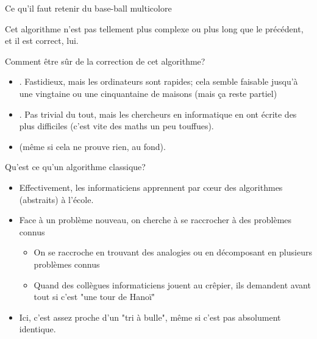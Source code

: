 \documentclass[final,hyperref={pdfpagelabels=false}]{beamer}
\begin{document}
\begin{frame}{Ce qu'il faut retenir du base-ball multicolore}

  Cet algorithme n'est pas tellement plus complexe ou plus long que le
  précédent, et il est correct, lui.

  \begin{block}{Comment être sûr de la \alert{correction} de cet algorithme?}
    \begin{itemize}
    \item {}. Fastidieux, mais les
      ordinateurs sont rapides; cela semble faisable jusqu'à une vingtaine ou
      une cinquantaine de maisons (mais ça reste partiel)
    \item {}. Pas trivial
      du tout, mais les chercheurs en informatique en ont écrite des plus
      difficiles (c'est vite des maths un peu touffues).
    \item {} (même
      si cela ne prouve rien, au fond).
    \end{itemize}
  \end{block}

  \begin{block}{Qu'est ce qu'un \alert{algorithme classique}?}
    \begin{itemize}
    \item Effectivement, les informaticiens apprennent par cœur des algorithmes
      (abstraits) à l'école.
    \item Face à un problème nouveau, on cherche à se raccrocher à des
      problèmes connus
      \begin{itemize}
      \item On se raccroche en trouvant des analogies ou en décomposant en
        plusieurs problèmes connus
      \item Quand des collègues informaticiens jouent au crêpier, ils demandent
        avant tout si c'est "une tour de Hanoï" 
      \end{itemize}
    \item Ici, c'est assez proche d'un "tri à bulle", même si c'est pas
      absolument identique.
    \end{itemize}
  \end{block}


\end{frame}
\end{document}
